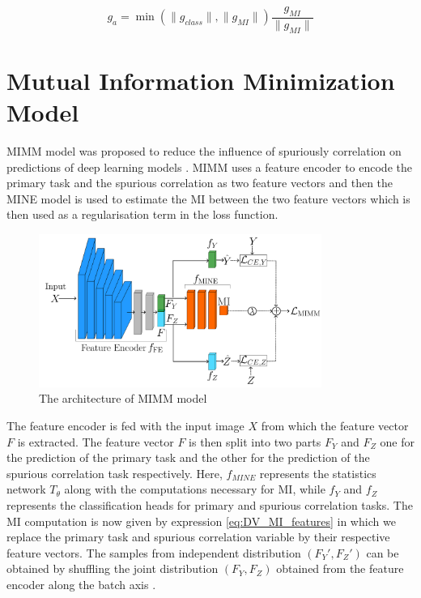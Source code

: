 \documentclass[12pt,DIV14,BCOR12mm,a4paper,footinclude=false,headinclude,parskip=half-,twoside,openright,cleardoublepage=empty,toc=index,bibliography=totoc,listof=totoc]{scrreprt}
\numberwithin{equation}{chapter}
\begin{document}
\begin{equation}\label{eq:adaptive_scaling}
g_a = \min \left( \| g_{class} \|, \| g_{MI} \| \right)\frac{g_{MI}}{\| g_{MI} \|}
\end{equation}



\section{Mutual Information Minimization Model}\label{sec:2.4}
MIMM model was proposed to reduce the influence of spuriously correlation on predictions of deep learning models \cite{10162210}. MIMM uses a feature encoder to encode the primary task and the spurious correlation as two feature vectors and then the MINE model is used to estimate the MI between the two feature vectors which is then used as a regularisation term in the loss function.

\begin{figure}[H]
    \centering
    \includegraphics[height=5cm]{thesis/figures/MIMM_model.PNG} 
    \caption{The architecture of MIMM model \cite{10162210}}
    \label{fig:MIMM_model}
\end{figure}

The feature encoder is fed with the input image $X$ from which the feature vector $F$ is extracted. The feature vector $F$ is then split into two parts $F_Y$ and $F_Z$ one for the prediction of the primary task and the other for the prediction of the spurious correlation task respectively. Here, $f_{MINE}$ represents the statistics network $T_{\theta}$ along with the computations necessary for MI, while $f_Y$ and $f_Z$ represents the classification heads for primary and spurious correlation tasks. The MI computation is now given by expression \ref{eq:DV_MI_features} in which we replace the primary task and spurious correlation variable by their respective feature vectors. The samples from independent distribution $(F_Y',F_Z')$ can be obtained by shuffling the joint distribution $(F_Y, F_Z)$ obtained from the feature encoder along the batch axis \cite{DBLP:journals/corr/abs-1801-04062}.
\end{document}
